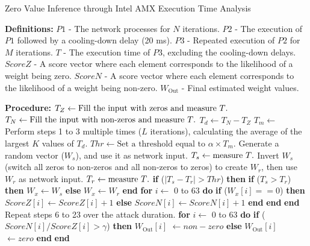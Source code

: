 \begin{algorithm}[!bp]
\caption{ Zero Value Inference through Intel AMX Execution Time Analysis}
{\footnotesize\begin{algorithmic}[1]
\Statex \textbf{Definitions:}
\Statex \( P1 \) - The network processes for \( N \) iterations.
\Statex \( P2 \) - The execution of \( P1 \) followed by a cooling-down delay (20 ms).
\Statex \( P3 \) - Repeated execution of \( P2 \) for  \( M \) iterations.
\Statex \( T \) - The execution time of \( P3 \), excluding the cooling-down delays.
\Statex \( ScoreZ \) - A score vector where each element corresponds to the likelihood of a weight being zero.
\Statex \( ScoreN \) - A score vector where each element corresponds to the likelihood of a weight being non-zero.
\Statex \( W_{\text{Out}} \) - Final estimated weight values.

\Statex \textbf{Procedure:}
\State $T_Z \gets \text{Fill the input with zeros and measure \( T \).}$
\State $T_N \gets \text{Fill the input with non-zeros and measure \( T \).}$
\State $T_d \gets T_N - T_Z$
\State $T_m \gets$ Perform steps 1 to 3 multiple times (\(L\) iterations), calculating the average of the largest \(K\) values of \(T_d\).
\State $Thr \gets \text{Set a threshold equal to } \alpha \times T_m.$
\State Generate a random vector (\( W_s \)), and use it as network input.
\State $T_s \gets \text{measure \( T \).}$
\State Invert \( W_s \) (switch all zeros to non-zeros and all non-zeros to zeros) to create \( W_r \), then use \( W_r \) as network input.
\State $T_r \gets \text{measure \( T \).}$
\State \textbf{if } (\(|T_s - T_r| > Thr\)) \textbf{then} 
\State \quad \textbf{if } (\(T_s > T_r\)) \textbf{then} 
\State \quad \quad $W_x \gets W_s$
\State \quad \textbf{else}
\State \quad \quad $W_x \gets W_r$
\State \quad \textbf{end}
\State \quad \textbf{for } $i \gets$ 0 to 63 \textbf{do} 
\State \quad \quad \textbf{if } (\(W_x[i] == 0\)) \textbf{then} 
\State \quad \quad \quad $ScoreZ[i] \gets ScoreZ[i]+1$
\State \quad \quad \textbf{else }
\State \quad \quad \quad $ScoreN[i] \gets ScoreN[i]+1$
\State \quad \quad \textbf{end}
\State \quad \textbf{end}
\State \textbf{end}
\State Repeat steps 6 to 23 over the attack duration.
\State \textbf{for } $i \gets$ 0 to 63 \textbf{do} 
\State \quad \textbf{if } (\(ScoreN[i]/ScoreZ[i] > \gamma\)) \textbf{then} 
\State \quad \quad \( W_{\text{Out}}[i] \) $\gets non-zero$
\State \quad \textbf{else }
\State \quad \quad \( W_{\text{Out}}[i] \) $\gets zero$
\State \quad \textbf{end}
\State \textbf{end}
\end{algorithmic}}
\label{alg:alg1}
\end{algorithm}